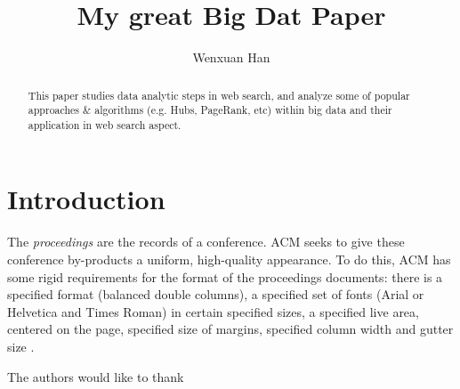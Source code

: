 \documentclass[sigconf]{acmart}
\begin{document}
\title{My great Big Dat Paper}


\author{Wenxuan Han}



\begin{abstract}
This paper studies data analytic steps in web search, and analyze some of popular approaches \& algorithms (e.g. Hubs, PageRank, etc) within big data and their application in web search aspect.
\end{abstract}



\maketitle

\section{Introduction}

The \textit{proceedings} are the records of a
conference. ACM seeks to give these
conference by-products a uniform, high-quality appearance.  To do
this, ACM has some rigid requirements for the format of the
proceedings documents: there is a specified format (balanced double
columns), a specified set of fonts (Arial or Helvetica and Times
Roman) in certain specified sizes, a specified live area, centered on
the page, specified size of margins, specified column width and gutter
size \cite{editor00}.


\begin{acks}

  The authors would like to thank 

\end{acks}


 
\end{document}
